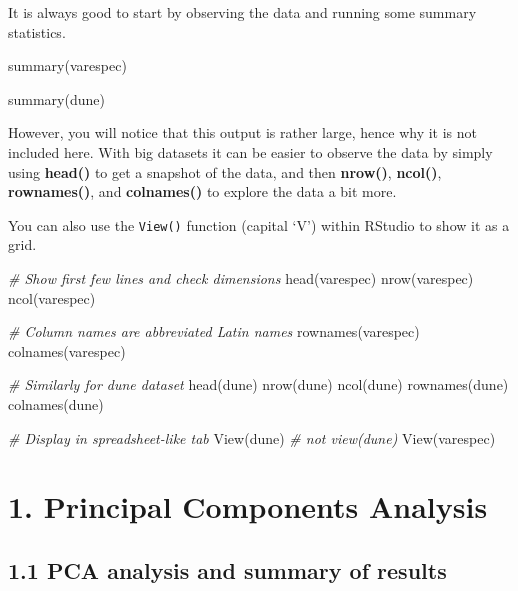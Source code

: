 \documentclass[
]{article}
\newenvironment{Shaded}{\begin{snugshade}}{\end{snugshade}}
\newcommand{\CommentTok}[1]{\textcolor[rgb]{0.56,0.35,0.01}{\textit{#1}}}
\newcommand{\FunctionTok}[1]{\textcolor[rgb]{0.00,0.00,0.00}{#1}}
\newcommand{\NormalTok}[1]{#1}
\begin{document}
It is always good to start by observing the data and running some
summary statistics.

\begin{Shaded}
\begin{Highlighting}[]
\FunctionTok{summary}\NormalTok{(varespec)}

\FunctionTok{summary}\NormalTok{(dune)}
\end{Highlighting}
\end{Shaded}

However, you will notice that this output is rather large, hence why it
is not included here. With big datasets it can be easier to observe the
data by simply using \textbf{head()} to get a snapshot of the data, and
then \textbf{nrow()}, \textbf{ncol()}, \textbf{rownames()}, and
\textbf{colnames()} to explore the data a bit more.

You can also use the \texttt{View()} function (capital `V') within
RStudio to show it as a grid.

\begin{Shaded}
\begin{Highlighting}[]
\CommentTok{\# Show first few lines and check dimensions}
\FunctionTok{head}\NormalTok{(varespec)}
\FunctionTok{nrow}\NormalTok{(varespec)}
\FunctionTok{ncol}\NormalTok{(varespec)}

\CommentTok{\# Column names are abbreviated Latin names}
\FunctionTok{rownames}\NormalTok{(varespec)}
\FunctionTok{colnames}\NormalTok{(varespec)}

\CommentTok{\# Similarly for dune dataset}
\FunctionTok{head}\NormalTok{(dune)}
\FunctionTok{nrow}\NormalTok{(dune)}
\FunctionTok{ncol}\NormalTok{(dune)}
\FunctionTok{rownames}\NormalTok{(dune)}
\FunctionTok{colnames}\NormalTok{(dune)}

\CommentTok{\# Display in spreadsheet{-}like tab}
\FunctionTok{View}\NormalTok{(dune) }\CommentTok{\# not view(dune)}
\FunctionTok{View}\NormalTok{(varespec)}
\end{Highlighting}
\end{Shaded}

\hypertarget{principal-components-analysis}{%
\section{1. Principal Components
Analysis}\label{principal-components-analysis}}

\hypertarget{pca-analysis-and-summary-of-results}{%
\subsection{1.1 PCA analysis and summary of
results}\label{pca-analysis-and-summary-of-results}}
\end{document}
